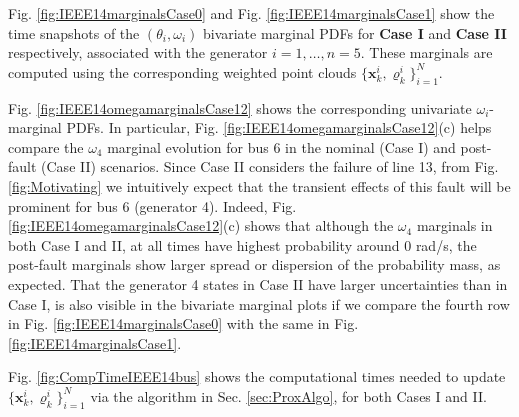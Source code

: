 \documentclass[10pt,twocolumn]{IEEEtran}
\begin{document}
Fig. \ref{fig:IEEE14marginalsCase0} and Fig. \ref{fig:IEEE14marginalsCase1} show the time snapshots of the $(\theta_{i},\omega_{i})$ bivariate marginal PDFs for \textbf{Case I} and \textbf{Case II} respectively, associated with the generator $i=1,\hdots, n=5$. These marginals are computed using the corresponding weighted point clouds $\{\bm{x}_{k}^{i},\varrho_{k}^{i}\}_{i=1}^{N}$.


Fig. \ref{fig:IEEE14omegamarginalsCase12} shows the corresponding univariate $\omega_{i}$-marginal PDFs. In particular, Fig. \ref{fig:IEEE14omegamarginalsCase12}(c) helps compare the $\omega_{4}$ marginal evolution for bus 6 in the nominal (Case I) and post-fault (Case II) scenarios. Since Case II considers the failure of line 13, from Fig. \ref{fig:Motivating} we intuitively expect that the transient effects of this fault will be prominent for bus 6 (generator 4). Indeed, Fig. \ref{fig:IEEE14omegamarginalsCase12}(c) shows that although the $\omega_{4}$ marginals in both Case I and II, at all times have highest probability around $0$ rad/s, the post-fault marginals show larger spread or dispersion of the probability mass, as expected. That the generator 4 states in Case II have larger uncertainties than in Case I, is also visible in the bivariate marginal plots if we compare the fourth row in Fig. \ref{fig:IEEE14marginalsCase0} with the same in Fig. \ref{fig:IEEE14marginalsCase1}.




Fig. \ref{fig:CompTimeIEEE14bus} shows the computational times needed to update $\{\bm{x}_{k}^{i},\varrho_{k}^{i}\}_{i=1}^{N}$ via the algorithm in Sec. \ref{sec:ProxAlgo}, for both Cases I and II.  
\end{document}
